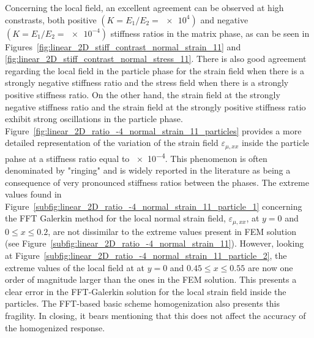 Concerning the local field, an excellent agreement can be observed at high constrasts, both positive \((K=E_1/E_2=\num{e4})\) and negative \((K=E_1/E_2=\num{e-4})\) stiffness ratios in the matrix phase, as can be seen in Figures~\ref{fig:linear_2D_stiff_contrast_normal_strain_11} and \ref{fig:linear_2D_stiff_contrast_normal_stress_11}.
There is also good agreement regarding the local field in the particle phase for the strain field when there is a strongly negative stiffness ratio and the stress field when there is a strongly positive stiffness ratio.
On the other hand, the strain field at the strongly negative stiffness ratio and the strain field at the strongly positive stiffness ratio exhibit strong oscillations in the particle phase.
Figure~\ref{fig:linear_2D_ratio_-4_normal_strain_11_particles} provides a more detailed representation of the variation of the strain field \(\varepsilon_{\mu,xx}\) inside the particle pahse at a stiffness ratio equal to \num{e-4}.
This phenomenon is often denominated by "ringing" and is widely reported in the literature as being a consequence of very pronounced stiffness ratios between the phases.
The extreme values found in Figure~\ref{subfig:linear_2D_ratio_-4_normal_strain_11_particle_1} concerning the FFT Galerkin method for the local normal strain field, \(\varepsilon_{\mu,xx}\), at \(y=0\) and \(0\leq x\leq 0.2\), are not dissimilar to the extreme values present in FEM solution (see Figure~\ref{subfig:linear_2D_ratio_-4_normal_strain_11}).
However, looking at Figure~\ref{subfig:linear_2D_ratio_-4_normal_strain_11_particle_2}, the extreme values of the local field at at \(y=0\) and \(0.45 \leq x\leq 0.55\) are now one order of magnitude larger than the ones in the FEM solution.
This presents a clear error in the FFT-Galerkin solution for the local strain field inside the particles.
The FFT-based basic scheme homogenization also presents this fragility.
In closing, it bears mentioning that this does not affect the accuracy of the homogenized response.


